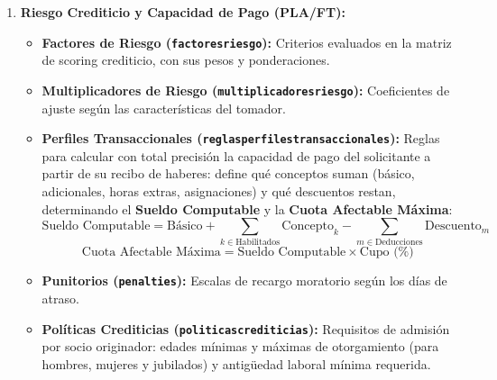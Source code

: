 \documentclass[12pt,a4paper]{article}
\renewcommand{\_}{\textunderscore\allowbreak}
\begin{document}
\begin{enumerate}
    \item \textbf{Riesgo Crediticio y Capacidad de Pago (PLA/FT):}
          \begin{itemize}\raggedright
              \item \textbf{Factores de Riesgo (\texttt{factores\_riesgo}):} Criterios evaluados en la matriz de scoring crediticio, con sus pesos y ponderaciones.
              \item \textbf{Multiplicadores de Riesgo (\texttt{multiplicadores\_riesgo}):} Coeficientes de ajuste según las características del tomador.
              \item \textbf{Perfiles Transaccionales (\texttt{reglas\_perfiles\_transaccionales}):} Reglas para calcular con total precisión la capacidad de pago del solicitante a partir de su recibo de haberes: define qué conceptos suman (básico, adicionales, horas extras, asignaciones) y qué descuentos restan, determinando el \textbf{Sueldo Computable} y la \textbf{Cuota Afectable Máxima}:
                    \begin{equation}
                        \text{Sueldo Computable} = \text{Básico} + \sum_{k \in \text{Habilitados}} \text{Concepto}_{k} - \sum_{m \in \text{Deducciones}} \text{Descuento}_{m}
                    \end{equation}
                    \begin{equation}
                        \text{Cuota Afectable Máxima} = \text{Sueldo Computable} \times \text{Cupo (\%)}
                    \end{equation}
              \item \textbf{Punitorios (\texttt{penalties}):} Escalas de recargo moratorio según los días de atraso.
              \item \textbf{Políticas Crediticias (\texttt{politicas\_crediticias}):} Requisitos de admisión por socio originador: edades mínimas y máximas de otorgamiento (para hombres, mujeres y jubilados) y antigüedad laboral mínima requerida.
          \end{itemize}
\end{enumerate}
\end{document}
